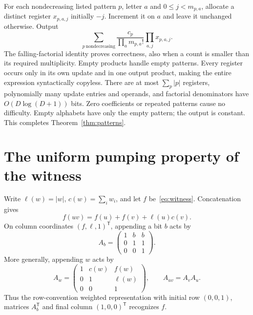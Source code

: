\documentclass[acmlarge,screen,11pt,nonacm]{acmart}
\theoremstyle{definition}
\begin{document}
For each nondecreasing listed pattern $p$, letter $a$ and $0\leq j<m_{p,a}$, allocate a distinct register $x_{p,a,j}$ initially $-j$. Increment it on $a$ and leave it unchanged otherwise. Output
\begin{equation}\label{eq:synthesis}
 \sum_{p\ \mathrm{nondecreasing}}
 \frac{c_p}{\prod_a m_{p,a}!}\prod_{a,j}x_{p,a,j}.
\end{equation}
The falling-factorial identity proves correctness, also when a count is smaller than its required multiplicity. Empty products handle empty patterns. Every register occurs only in its own update and in one output product, making the entire expression syntactically copyless. There are at most $\sum_p|p|$ registers, polynomially many update entries and operands, and factorial denominators have $O(D\log(D+1))$ bits. Zero coefficients or repeated patterns cause no difficulty. Empty alphabets have only the empty pattern; the output is constant. This completes Theorem~\ref{thm:patterns}.

\section{The uniform pumping property of the witness}\label{sec:pumping}
Write $\ell(w)=|w|$, $c(w)=\sum_i w_i$, and let $f$ be~\eqref{eq:witness}. Concatenation gives
\begin{equation}\label{eq:concat}
 f(uv)=f(u)+f(v)+\ell(u)c(v).
\end{equation}
On column coordinates $(f,\ell,1)^\mathsf{T}$, appending a bit $b$ acts by
\[
 A_b=\begin{pmatrix}1&b&b\\0&1&1\\0&0&1\end{pmatrix}.
\]
More generally, appending $w$ acts by
\begin{equation}\label{eq:Aw}
 A_w=\begin{pmatrix}1&c(w)&f(w)\\0&1&\ell(w)\\0&0&1\end{pmatrix},
 \qquad A_{uv}=A_vA_u.
\end{equation}
Thus the row-convention weighted representation with initial row $(0,0,1)$, matrices $A_b^\mathsf{T}$ and final column $(1,0,0)^\mathsf{T}$ recognizes $f$.
\end{document}
